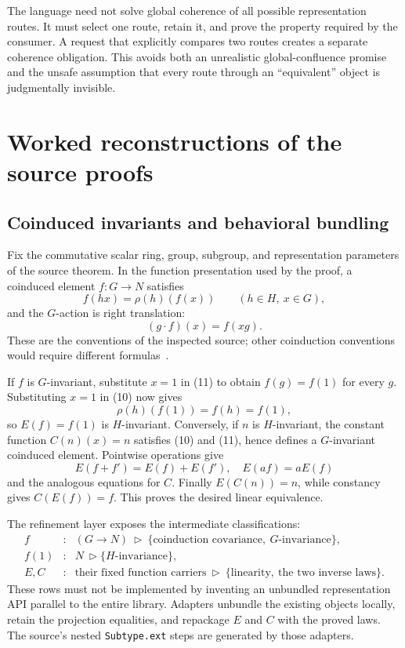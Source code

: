 \documentclass[11pt,letterpaper]{article}
\newcommand{\code}[1]{\nolinkurl{#1}}
\theoremstyle{definition}
\theoremstyle{remark}
\begin{document}
The language need not solve global coherence of all possible representation
routes. It must select one route, retain it, and prove the property required by
the consumer. A request that explicitly compares two routes creates a separate
coherence obligation. This avoids both an unrealistic global-confluence promise
and the unsafe assumption that every route through an ``equivalent'' object is
judgmentally invisible.

\section{Worked reconstructions of the source proofs}\label{sec:cases}

\subsection{Coinduced invariants and behavioral bundling}\label{sec:coind}
Fix the commutative scalar ring, group, subgroup, and representation parameters
of the source theorem. In the function presentation used by the proof, a
coinduced element $f:G\to N$ satisfies
\[
f(hx)=\rho(h)(f(x))\qquad(h\in H,\ x\in G),
\tag{10}
\]
and the $G$-action is right translation:
\[
(g\cdot f)(x)=f(xg).
\tag{11}
\]
These are the conventions of the inspected source; other coinduction conventions
would require different formulas~\cite{FCoind}.

If $f$ is $G$-invariant, substitute $x=1$ in (11) to obtain $f(g)=f(1)$ for every
$g$. Substituting $x=1$ in (10) now gives
\[
\rho(h)(f(1))=f(h)=f(1),
\]
so $E(f)=f(1)$ is $H$-invariant. Conversely, if $n$ is $H$-invariant, the constant
function $C(n)(x)=n$ satisfies (10) and (11), hence defines a $G$-invariant
coinduced element. Pointwise operations give
\[
E(f+f')=E(f)+E(f'),\quad E(af)=aE(f)
\]
and the analogous equations for $C$. Finally $E(C(n))=n$, while constancy gives
$C(E(f))=f$. This proves the desired linear equivalence.

The refinement layer exposes the intermediate classifications:
\[
\begin{array}{rcl}
f &:& (G\to N)\ \triangleright\
 \{\text{coinduction covariance},\ \text{$G$-invariance}\},\\
f(1)&:&N\ \triangleright\{\text{$H$-invariance}\},\\
E,C&:&\text{their fixed function carriers}\ \triangleright\
 \{\text{linearity},\ \text{the two inverse laws}\}.
\end{array}
\]
These rows must not be implemented by inventing an unbundled representation API
parallel to the entire library. Adapters unbundle the existing objects locally,
retain the projection equalities, and repackage $E$ and $C$ with the proved laws.
The source's nested \code{Subtype.ext} steps are generated by those adapters.
\end{document}
